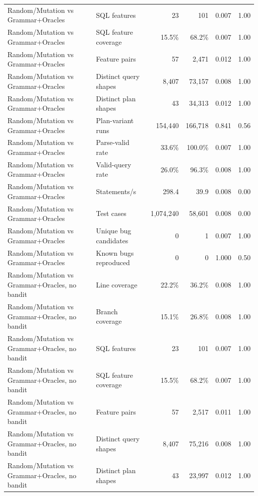 \begin{table}[t]
\begin{tabular}{llrrrr}
    Random/Mutation vs Grammar+Oracles & SQL features & 23 & 101 & 0.007 & 1.00 \\
    Random/Mutation vs Grammar+Oracles & SQL feature coverage & 15.5\% & 68.2\% & 0.007 & 1.00 \\
    Random/Mutation vs Grammar+Oracles & Feature pairs & 57 & 2{,}471 & 0.012 & 1.00 \\
    Random/Mutation vs Grammar+Oracles & Distinct query shapes & 8{,}407 & 73{,}157 & 0.008 & 1.00 \\
    Random/Mutation vs Grammar+Oracles & Distinct plan shapes & 43 & 34{,}313 & 0.012 & 1.00 \\
    Random/Mutation vs Grammar+Oracles & Plan-variant runs & 154{,}440 & 166{,}718 & 0.841 & 0.56 \\
    Random/Mutation vs Grammar+Oracles & Parse-valid rate & 33.6\% & 100.0\% & 0.007 & 1.00 \\
    Random/Mutation vs Grammar+Oracles & Valid-query rate & 26.0\% & 96.3\% & 0.008 & 1.00 \\
    Random/Mutation vs Grammar+Oracles & Statements/s & 298.4 & 39.9 & 0.008 & 0.00 \\
    Random/Mutation vs Grammar+Oracles & Test cases & 1{,}074{,}240 & 58{,}601 & 0.008 & 0.00 \\
    Random/Mutation vs Grammar+Oracles & Unique bug candidates & 0 & 1 & 0.007 & 1.00 \\
    Random/Mutation vs Grammar+Oracles & Known bugs reproduced & 0 & 0 & 1.000 & 0.50 \\
    Random/Mutation vs Grammar+Oracles, no bandit & Line coverage & 22.2\% & 36.2\% & 0.008 & 1.00 \\
    Random/Mutation vs Grammar+Oracles, no bandit & Branch coverage & 15.1\% & 26.8\% & 0.008 & 1.00 \\
    Random/Mutation vs Grammar+Oracles, no bandit & SQL features & 23 & 101 & 0.007 & 1.00 \\
    Random/Mutation vs Grammar+Oracles, no bandit & SQL feature coverage & 15.5\% & 68.2\% & 0.007 & 1.00 \\
    Random/Mutation vs Grammar+Oracles, no bandit & Feature pairs & 57 & 2{,}517 & 0.011 & 1.00 \\
    Random/Mutation vs Grammar+Oracles, no bandit & Distinct query shapes & 8{,}407 & 75{,}216 & 0.008 & 1.00 \\
    Random/Mutation vs Grammar+Oracles, no bandit & Distinct plan shapes & 43 & 23{,}997 & 0.012 & 1.00 \\

\end{tabular}
\end{table}

